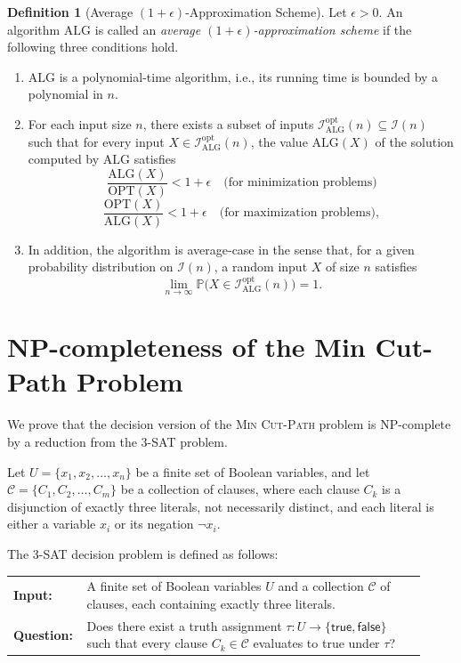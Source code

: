 \documentclass[a4paper,fleqn]{cas-sc}
\numberwithin{equation}{section}
\theoremstyle{definition}
\newtheorem{definition}{Definition}[section]
\theoremstyle{plain}
\theoremstyle{remark}
\newcommand{\OPT}{\mathrm{OPT}}
\newcommand{\ALG}{\mathrm{ALG}}
\newcommand{\MinCutPath}{\textsc{Min Cut-Path}}
\newcommand{\ThreeSAT}{\textsc{3-SAT}}
\begin{document}
\begin{definition}[Average $(1+\epsilon)$-Approximation Scheme]
\label{def:approximation-scheme}
Let $\epsilon > 0$. An algorithm $\ALG$ is called an \emph{average $(1+\epsilon)$-approximation scheme} if the following three conditions hold.
\begin{enumerate}
    \item $\ALG$ is a polynomial-time algorithm, i.e., its running time is bounded by a polynomial in $n$.
    \item For each input size $n$, there exists a subset of inputs $\mathcal{I}_{\ALG}^{\mathrm{opt}}(n) \subseteq \mathcal{I}(n)$ such that for every input $X \in \mathcal{I}_{\ALG}^{\mathrm{opt}}(n)$, the value $\ALG(X)$ of the solution computed by $\ALG$ satisfies
    \[
    \frac{\ALG(X)}{\OPT(X)} < 1+\epsilon \quad \text{(for minimization problems)}
    \]
    \[
    \frac{\OPT(X)}{\ALG(X)} < 1+\epsilon \quad \text{(for maximization problems)},
    \]
    \item In addition, the algorithm is average-case in the sense that, for a given probability distribution on $\mathcal{I}(n)$, a random input $X$ of size $n$ satisfies
    \[
    \lim_{n \to \infty} \mathbb{P}\bigl(X \in \mathcal{I}_{\ALG}^{\mathrm{opt}}(n)\bigr) = 1.
    \]
\end{enumerate}
\end{definition}

\section{NP-completeness of the Min Cut-Path Problem}
\label{sec:np-completeness}
We prove that the decision version of the \MinCutPath{} problem is NP-complete by a reduction from the \ThreeSAT{} problem.

\begin{problem}[\ThreeSAT]
Let $U = \{x_1, x_2, \dots, x_n\}$ be a finite set of Boolean variables, and let
$\mathcal{C} = \{C_1, C_2, \dots, C_m\}$ be a collection of clauses, where each clause
$C_k$ is a disjunction of exactly three literals, not necessarily distinct, and each literal is either a variable $x_i$ or its negation $\neg x_i$.

The \ThreeSAT{} decision problem is defined as follows:

\begin{center}
\begin{tabular}{p{0.12\linewidth}p{0.8\linewidth}}
\textbf{Input:} & A finite set of Boolean variables $U$ and a collection $\mathcal{C}$ of clauses, each containing exactly three literals.\\
\textbf{Question:} & Does there exist a truth assignment $\tau: U \rightarrow \{\mathsf{true}, \mathsf{false}\}$ such that every clause $C_k \in \mathcal{C}$ evaluates to \textsf{true} under $\tau$?
\end{tabular}
\end{center}
\end{problem}
\end{document}
